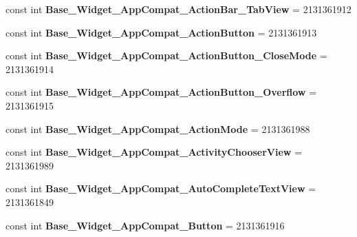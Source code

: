 \begin{DoxyCompactItemize}
const int {\bfseries Base\+\_\+\+Widget\+\_\+\+App\+Compat\+\_\+\+Action\+Bar\+\_\+\+Tab\+View} = 2131361912
\item 
\mbox{\label{class_pinned_app_1_1_droid_1_1_resource_1_1_style_a76b220c833b72d2067f5652307110145}} 
const int {\bfseries Base\+\_\+\+Widget\+\_\+\+App\+Compat\+\_\+\+Action\+Button} = 2131361913
\item 
\mbox{\label{class_pinned_app_1_1_droid_1_1_resource_1_1_style_a04eac3f17a33bcf7b9e0fcd7c8f3db4c}} 
const int {\bfseries Base\+\_\+\+Widget\+\_\+\+App\+Compat\+\_\+\+Action\+Button\+\_\+\+Close\+Mode} = 2131361914
\item 
\mbox{\label{class_pinned_app_1_1_droid_1_1_resource_1_1_style_aec6e294a71eb58437c5b0bbe41da9aa1}} 
const int {\bfseries Base\+\_\+\+Widget\+\_\+\+App\+Compat\+\_\+\+Action\+Button\+\_\+\+Overflow} = 2131361915
\item 
\mbox{\label{class_pinned_app_1_1_droid_1_1_resource_1_1_style_a9edbc01f3c8246629ad788c32f20be71}} 
const int {\bfseries Base\+\_\+\+Widget\+\_\+\+App\+Compat\+\_\+\+Action\+Mode} = 2131361988
\item 
\mbox{\label{class_pinned_app_1_1_droid_1_1_resource_1_1_style_a1a83f84a7ebdb122e69954e8a2e0cba6}} 
const int {\bfseries Base\+\_\+\+Widget\+\_\+\+App\+Compat\+\_\+\+Activity\+Chooser\+View} = 2131361989
\item 
\mbox{\label{class_pinned_app_1_1_droid_1_1_resource_1_1_style_aaeed6c6bff46d8b0b68c668590a48983}} 
const int {\bfseries Base\+\_\+\+Widget\+\_\+\+App\+Compat\+\_\+\+Auto\+Complete\+Text\+View} = 2131361849
\item 
\mbox{\label{class_pinned_app_1_1_droid_1_1_resource_1_1_style_aba3af03f7789b3bfc2d2f3672a7afdc7}} 
const int {\bfseries Base\+\_\+\+Widget\+\_\+\+App\+Compat\+\_\+\+Button} = 2131361916
\item 
\mbox{\label{class_pinned_app_1_1_droid_1_1_resource_1_1_style_a03e4320cc0a1bca52178c4ef78a798a3}} 

\end{DoxyCompactItemize}
